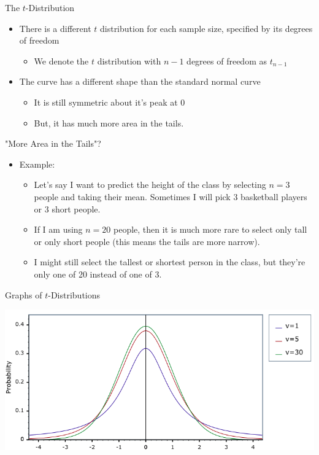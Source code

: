 \documentclass{beamer}
\begin{document}
\begin{frame}{The $t$-Distribution}
	\begin{itemize}
		\item There is a different $t$ distribution for each sample size, specified by its \alert{degrees of freedom}
			\begin{itemize}
				\item We denote the $t$ distribution with $n-1$ degrees of freedom as $t_{n-1}$
			\end{itemize}

		\item The curve has a different shape than the standard normal curve
			\begin{itemize}
		      	\item It is still symmetric about it's peak at 0
		      	
		      	\item But, it has much more area in the tails.
			\end{itemize}
	\end{itemize}
	
\end{frame}

\begin{frame}{"More Area in the Tails"?}
	\begin{itemize}
		\item Example: 
		
		\begin{itemize}
			\item Let's say I want to predict the height of the class by selecting $n = 3$ people and taking their mean. Sometimes I will pick 3 basketball players or 3 short people.
			
			\item If I am using $n = 20$ people, then it is much more rare to select only tall or only short people (this means the tails are more narrow).
			
			\item I might still select the tallest or shortest person in the class, but they're only one of 20 instead of one of 3.
		\end{itemize}
	\end{itemize}

\end{frame}

\begin{frame}{Graphs of $t$-Distributions}
	\begin{centering}
		\includegraphics[width=\textwidth]{tdists}
	\end{centering}
\end{frame}
\end{document}
